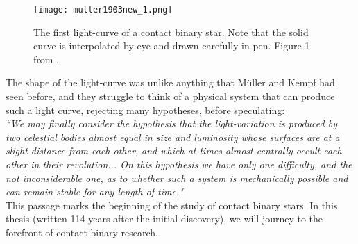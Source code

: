 \documentclass[12pt]{article} %
\numberwithin{equation}{section} %
\begin{document}
\begin{figure}[H]
\centering
\texttt{[image: muller1903new\_1.png]}
\caption{The first light-curve of a contact binary star. Note that the solid curve is interpolated by eye and drawn carefully in pen. Figure 1 from \citet{muller1903new}.}
\label{fig: muller1903new_1}
\end{figure}

The shape of the light-curve was unlike anything that M\"uller and Kempf had seen before, and they struggle to think of a physical system that can produce such a light curve, rejecting many hypotheses, before speculating: \\

\emph{``We may finally consider the hypothesis that the light-variation is produced by two celestial bodies almost equal in size and luminosity whose surfaces are at a slight distance from each other, and which at times almost centrally occult each other in their revolution... On this hypothesis we have only one difficulty, and the not inconsiderable one, as to whether such a system is mechanically possible and can remain stable for any length of time."} \\

This passage marks the beginning of the study of contact binary stars. In this thesis (written 114 years after the initial discovery), we will journey to the forefront of contact binary research.






\end{document}
